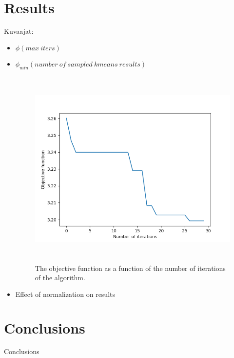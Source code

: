 \documentclass{article}
\begin{document}
\section{Results}
Kuvaajat: 
\begin{itemize}
	\item ${\phi(max\ iters)}$
	\item ${\phi_{min}(number\ of\ sampled\ kmeans\ results)}$
		\begin{figure}[htb]
		\begin{center}
		\includegraphics[height=10cm]{plot2.png}
		\end{center}
		\caption{The objective function as a function of the number of iterations of the algorithm.}
		\end{figure}
	\item Effect of normalization on results
\end{itemize}

\section{Conclusions}

Conclusions
\end{document}
